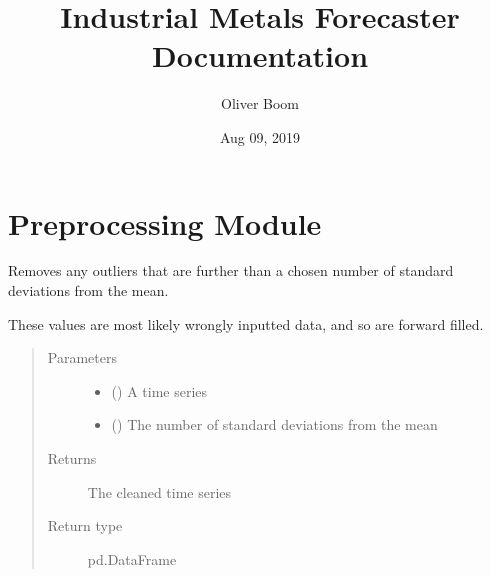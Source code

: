 \documentclass[letterpaper,10pt,english]{sphinxmanual}
\title{Industrial Metals Forecaster Documentation}
\date{Aug 09, 2019}
\author{Oliver Boom}
\begin{document}
\pagestyle{empty}
\sphinxmaketitle
\pagestyle{plain}
\sphinxtableofcontents
\pagestyle{normal}
\label{\detokenize{index::doc}}



\chapter{Preprocessing Module}
\label{\detokenize{index:module-Forecaster.preprocessing}}\label{\detokenize{index:preprocessing-module}}

\begin{fulllineitems}
\label{\detokenize{index:Forecaster.preprocessing.clean_data}}
Removes any outliers that are further than a chosen
number of standard deviations from the mean.

These values are most likely wrongly inputted data,
and so are forward filled.
\begin{quote}\begin{description}
\item[{Parameters}] \leavevmode\begin{itemize}
\item {} 
 () \textendash{} A time series

\item {} 
 () \textendash{} The number of standard deviations from the mean

\end{itemize}

\item[{Returns}] \leavevmode
The cleaned time series

\item[{Return type}] \leavevmode
pd.DataFrame

\end{description}\end{quote}

\end{fulllineitems}
\end{document}
